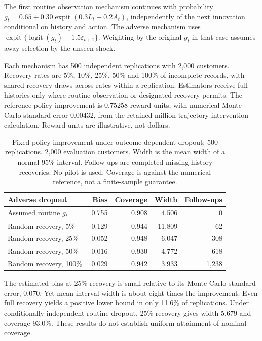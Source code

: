 The first routine observation mechanism continues with probability
$g_t=0.65+0.30\operatorname{expit}(0.3L_t-0.2A_t)$, independently of the
next innovation conditional on history and action. The adverse mechanism
uses $\operatorname{expit}\{\operatorname{logit}(g_t)+1.5\varepsilon_{t+1}\}$.
Weighting by the original $g_t$ in that case assumes away selection by the
unseen shock.

Each mechanism has 500 independent replications with 2,000 customers.
Recovery rates are 5\%, 10\%, 25\%, 50\% and 100\% of incomplete records,
with shared recovery draws across rates within a replication. Estimators
receive full histories only where routine observation or designated recovery
permits. The reference policy improvement is 0.75258 reward units, with
numerical Monte Carlo standard error 0.00432, from the retained
million-trajectory intervention calculation. Reward units are illustrative,
not dollars.

\begin{table}[htbp]
\centering\small
\begin{tabular}{lrrrr}
\toprule
Adverse dropout & Bias & Coverage & Width & Follow-ups\\
\midrule
Assumed routine $g_t$ & 0.755 & 0.908 & 4.506 & 0\\
Random recovery, 5\% & -0.129 & 0.944 & 11.809 & 62\\
Random recovery, 25\% & -0.052 & 0.948 & 6.047 & 308\\
Random recovery, 50\% & 0.016 & 0.930 & 4.772 & 618\\
Random recovery, 100\% & 0.029 & 0.942 & 3.933 & 1,238\\
\bottomrule
\end{tabular}
\caption{Fixed-policy improvement under outcome-dependent dropout;
500 replications, 2,000 evaluation customers. Width is the mean width of a
normal 95\% interval. Follow-ups are completed missing-history recoveries.
No pilot is used. Coverage is against the numerical reference, not a
finite-sample guarantee.}
\end{table}

The estimated bias at 25\% recovery is small relative to its Monte Carlo
standard error, 0.070. Yet mean interval width is about eight times the
improvement. Even full recovery yields a positive lower bound in only
11.6\% of replications. Under conditionally independent routine dropout,
25\% recovery gives width 5.679 and coverage 93.0\%. These results do not
establish uniform attainment of nominal coverage.

